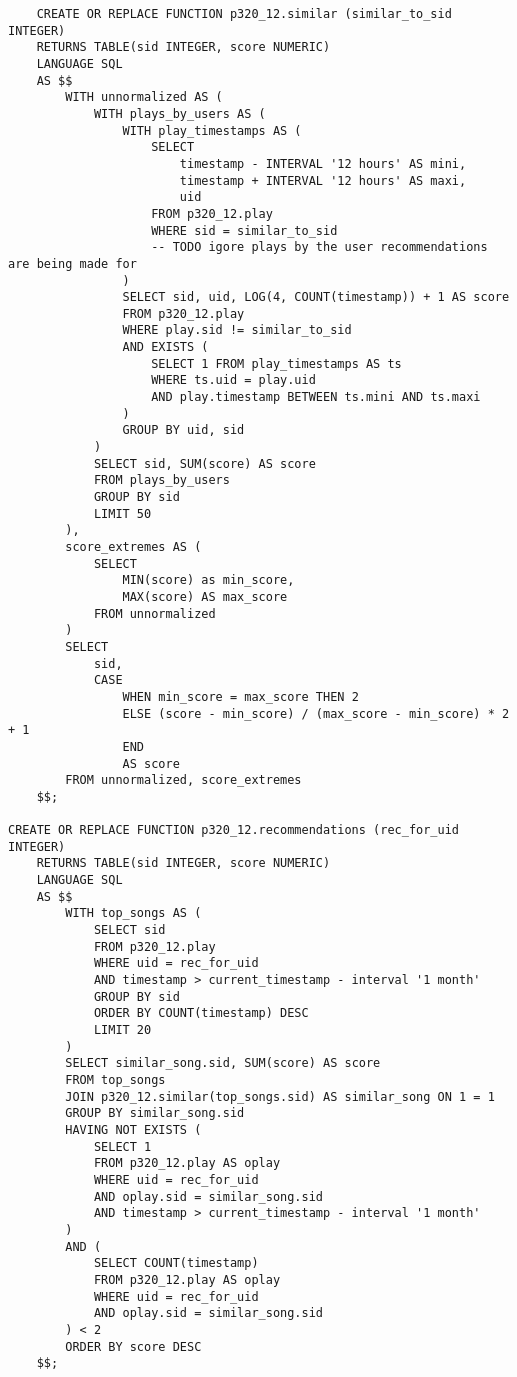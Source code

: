 \documentclass[12pt]{article}
\begin{document}
    \begin{lstlisting}
    CREATE OR REPLACE FUNCTION p320_12.similar (similar_to_sid INTEGER)
	RETURNS TABLE(sid INTEGER, score NUMERIC)
	LANGUAGE SQL
	AS $$
		WITH unnormalized AS (
			WITH plays_by_users AS (
				WITH play_timestamps AS (
					SELECT
						timestamp - INTERVAL '12 hours' AS mini,
						timestamp + INTERVAL '12 hours' AS maxi,
						uid
					FROM p320_12.play
					WHERE sid = similar_to_sid
					-- TODO igore plays by the user recommendations are being made for
				)
				SELECT sid, uid, LOG(4, COUNT(timestamp)) + 1 AS score
				FROM p320_12.play
				WHERE play.sid != similar_to_sid
				AND EXISTS (
					SELECT 1 FROM play_timestamps AS ts
					WHERE ts.uid = play.uid
					AND play.timestamp BETWEEN ts.mini AND ts.maxi
				)
				GROUP BY uid, sid
			)
			SELECT sid, SUM(score) AS score
			FROM plays_by_users
			GROUP BY sid
			LIMIT 50
		),
		score_extremes AS (
			SELECT
				MIN(score) as min_score,
				MAX(score) AS max_score
			FROM unnormalized
		)
		SELECT
			sid,
			CASE
				WHEN min_score = max_score THEN 2
				ELSE (score - min_score) / (max_score - min_score) * 2 + 1
				END
				AS score
		FROM unnormalized, score_extremes
	$$;

CREATE OR REPLACE FUNCTION p320_12.recommendations (rec_for_uid INTEGER)
	RETURNS TABLE(sid INTEGER, score NUMERIC)
	LANGUAGE SQL
	AS $$
		WITH top_songs AS (
			SELECT sid
			FROM p320_12.play
			WHERE uid = rec_for_uid
			AND timestamp > current_timestamp - interval '1 month'
			GROUP BY sid
			ORDER BY COUNT(timestamp) DESC
			LIMIT 20
		)
		SELECT similar_song.sid, SUM(score) AS score
		FROM top_songs
		JOIN p320_12.similar(top_songs.sid) AS similar_song ON 1 = 1
		GROUP BY similar_song.sid
		HAVING NOT EXISTS (
			SELECT 1
			FROM p320_12.play AS oplay
			WHERE uid = rec_for_uid
			AND oplay.sid = similar_song.sid
			AND timestamp > current_timestamp - interval '1 month'
		)
		AND (
			SELECT COUNT(timestamp)
			FROM p320_12.play AS oplay
			WHERE uid = rec_for_uid
			AND oplay.sid = similar_song.sid
		) < 2
		ORDER BY score DESC
	$$;

    \end{lstlisting}
\end{document}

